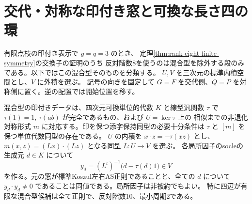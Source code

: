\section{交代・対称な印付き窓と可換な長さ四の環}
\label{sec:mixed-point-frobenius-algebras}
有限点枝の印付き表示で $g=q=3$ のとき、
定理\ref{thm:rank-eight-finite-symmetry}の交換子の証明のうち
反対階数8を使うのは混合型を除外する段のみである。以下ではこの混合型そのものを分類する。
$U,V$ を三次元の標準内積空間とし、$V$ に外積を選ぶ。
記号の向きを固定して $G=F$ を交代側、$Q=P$ を対称側に置く。逆の配置では開始位置を移す。
\begin{theorem}\label{thm:mixed-point-frobenius-algebras}
混合型の印付きデータは、四次元可換単位的代数 $K$ と線型汎関数 $\tau$ で
$\tau(1)=1$, $\tau(ab)$ が完全であるもの、および $U=\ker\tau$ 上の
相似までの非退化対称形式 $m$ に対応する。印を保つ添字保持同型の必要十分条件は
$\tau$ と $[m]$ を保つ単位代数同型の存在である。
$U$ の内積を $x\cdot z=-\tau(xz)$ とし、
$m(x,z)=(Lx)\cdot(Lz)$ となる同型 $L:U\to V$ を選ぶ。
各局所因子のsocleの生成元 $d\in K$ について
\[
      y_d=(L^t)^{-1}\big(d-\tau(d)1\big)\in V
\]
を作る。元の窓が標準Koszul左右AS正則であることと、全ての $d$ について
$y_d\cdot y_d\ne0$ であることは同値である。局所因子は非被約でもよい。
特に四辺が有限な混合型候補は全て正則で、反対階数10、最小周期2である。
\end{theorem}

